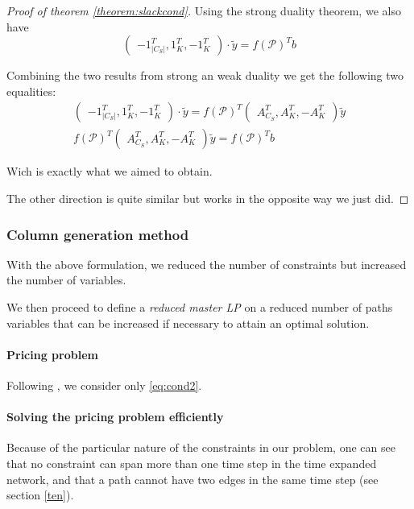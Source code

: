 \documentclass[14pt,a4paper]{article}
\theoremstyle{definition}
\numberwithin{equation}{subsection}
\begin{document}
\begin{proof}[Proof of theorem \ref{theorem:slackcond}]
 Using the strong duality theorem, we also have 
 $$\left( \begin{matrix} -1_{|C_S|}^T, 1_K^T, -1_K^T  \end{matrix} \right)\cdot \tilde{y} =  f(\mathcal{P})^Tb  $$

Combining the two results from strong an weak duality we get the following two equalities:
\begin{align*}
\left( \begin{matrix} -1_{|C_S|}^T, 1_K^T, -1_K^T  \end{matrix} \right)\cdot \tilde{y} = 
f(\mathcal{P})^T \left( \begin{matrix} A_{C_S}^T, A_K^T, -A_K^T \end{matrix} \right)\tilde{y} \\
f(\mathcal{P})^T \left( \begin{matrix} A_{C_S}^T, A_K^T, -A_K^T \end{matrix} \right)\tilde{y} =  f(\mathcal{P})^Tb 
\end{align*}

Wich is exactly what we aimed to obtain.

The other direction is quite similar but works in the opposite way we just did.

	 
	 
\end{proof}
\subsubsection{Column generation method}

With the above formulation,  we reduced the number of constraints but increased the number of variables. 

We then proceed to define a \emph{reduced master LP} on a reduced number of paths variables that can be increased if necessary to attain an optimal solution.

\paragraph{Pricing problem}
Following \cite[p.~669]{networkflows}, we consider only \eqref{eq:cond2}. 
\paragraph{Solving the pricing problem efficiently}

Because of the particular nature of the constraints in our problem, one can see that no constraint can span more than one time step in the time expanded network, and that a path cannot have two edges in the same time step (see section \ref*{ten}). 
\end{document}
